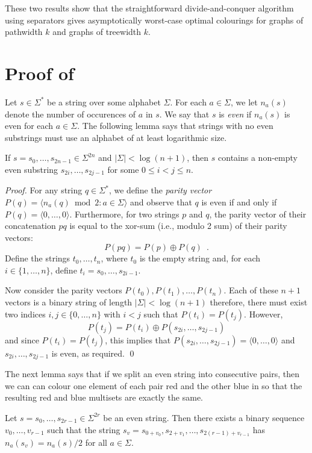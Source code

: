 \documentclass{llncs}
\begin{document}
These two results show that the straightforward divide-and-conquer
algorithm using separators gives asymptotically worst-case optimal
colourings for graphs of pathwidth $k$ and graphs of treewidth $k$.




\section{Proof of }

Let $s\in\Sigma^*$ be a string over some alphabet $\Sigma$.  For each
$a\in\Sigma$, we let $n_a(s)$ denote the number of occurences of $a$
in $s$.  We say that $s$ is \emph{even} if $n_a(s)$ is even for each
$a\in\Sigma$.  The following lemma says that strings with no even
substrings must use an alphabet of at least logarithmic size.

\begin{lem}
  If $s=s_0,\ldots,s_{2n-1}\in\Sigma^{2n}$ and $|\Sigma|< \log(n+1)$,
  then $s$ contains a non-empty even substring $s_{2i},\ldots,s_{2j-1}$
  for some $0\le i < j\le n$.
\end{lem}

\begin{proof}
  For any string $q\in\Sigma^*$, we define the \emph{parity vector}
  $P(q)=\langle n_a(q)\bmod 2: a\in\Sigma \rangle$ and observe that $q$ is
  even if and only if $P(q)=\langle 0,\ldots,0\rangle$.   Furthermore, for
  two strings $p$ and $q$, the parity vector of their concatenation $pq$
  is equal to the xor-sum (i.e., modulo 2 sum) of their parity vectors:
  \[
     P(pq) = P(p)\oplus P(q) \enspace .
  \] 
  Define the strings $t_0,\ldots,t_n$, where $t_0$ is the empty string
  and, for each $i\in\{1,\ldots,n\}$, define $t_i=s_0,\ldots,s_{2i-1}$.

  Now consider the parity vectors $P(t_0),P(t_1),\ldots,P(t_n)$.
  Each of these $n+1$ vectors is a binary string of length
  $|\Sigma| < \log(n+1)$ therefore, there must exist two indices
  $i,j\in\{0,\ldots,n\}$ with $i<j$ such that $P(t_i)=P(t_j)$.  However,
  \[
      P(t_j) = P(t_i) \oplus P(s_{2i},\ldots,s_{2j-1}) 
  \]
  and since $P(t_i)=P(t_j)$, this implies that $P(s_{2i},\ldots,s_{2j-1})=\langle0,\ldots,0\rangle$
  and $s_{2i},\ldots,s_{2j-1}$ is even, as required.
  \qed
\end{proof}


The next lemma says that if we split an even string into consecutive
pairs, then we can can colour one element of each pair red and the other
blue in so that the resulting red and blue multisets are exactly
the same.
\begin{lem}
  Let $s=s_0,\ldots,s_{2r-1}\in\Sigma^{2r}$ be an even string. Then there
  exists a binary sequence $v_0,\ldots,v_{r-1}$ such that the string
  $s_v=s_{0+v_0},s_{2+v_1},\ldots,s_{2(r-1)+v_{r-1}}$ 
  has $n_a(s_v)=n_a(s)/2$
  for all $a\in\Sigma$.
\end{lem}
\end{document}
